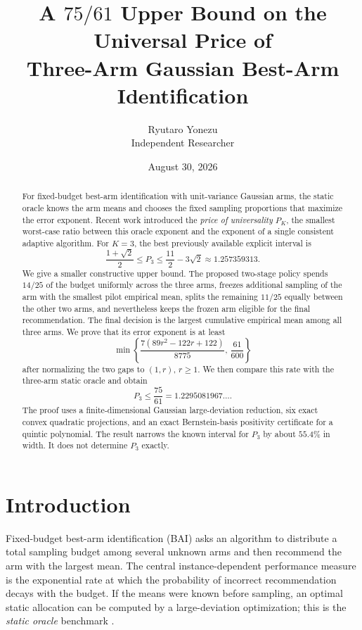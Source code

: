 \documentclass[11pt]{article}
\title{A $75/61$ Upper Bound on the Universal Price of\\Three-Arm Gaussian Best-Arm Identification}
\author{Ryutaro Yonezu\\Independent Researcher}
\date{August 30, 2026}
\theoremstyle{definition}
\theoremstyle{remark}
\begin{document}
\maketitle

\begin{abstract}
For fixed-budget best-arm identification with unit-variance Gaussian arms, the static oracle knows the arm means and chooses the fixed sampling proportions that maximize the error exponent. Recent work introduced the \emph{price of universality} $P_K$, the smallest worst-case ratio between this oracle exponent and the exponent of a single consistent adaptive algorithm. For $K=3$, the best previously available explicit interval is
\[
\frac{1+\sqrt 2}{2}\le P_3\le \frac{11}{2}-3\sqrt 2
\approx 1.257359313.
\]
We give a smaller constructive upper bound. The proposed two-stage policy spends $14/25$ of the budget uniformly across the three arms, freezes additional sampling of the arm with the smallest pilot empirical mean, splits the remaining $11/25$ equally between the other two arms, and nevertheless keeps the frozen arm eligible for the final recommendation. The final decision is the largest cumulative empirical mean among all three arms. We prove that its error exponent is at least
\[
\min\left\{
\frac{7(89r^2-122r+122)}{8775},\,\frac{61}{600}
\right\}
\]
after normalizing the two gaps to $(1,r)$, $r\ge 1$. We then compare this rate with the three-arm static oracle and obtain
\[
\boxed{P_3\le \frac{75}{61}=1.2295081967\ldots}.
\]
The proof uses a finite-dimensional Gaussian large-deviation reduction, six exact convex quadratic projections, and an exact Bernstein-basis positivity certificate for a quintic polynomial. The result narrows the known interval for $P_3$ by about $55.4\%$ in width. It does not determine $P_3$ exactly.
\end{abstract}

\section{Introduction}

Fixed-budget best-arm identification (BAI) asks an algorithm to distribute a total sampling budget among several unknown arms and then recommend the arm with the largest mean. The central instance-dependent performance measure is the exponential rate at which the probability of incorrect recommendation decays with the budget. If the means were known before sampling, an optimal static allocation can be computed by a large-deviation optimization; this is the \emph{static oracle} benchmark \cite{glynn2004}.
\end{document}
